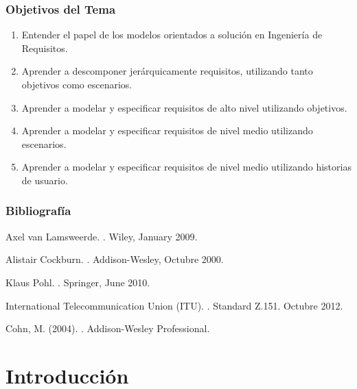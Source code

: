 \documentclass[handout,slidestop,xcolor=pst,dvips,blue]{beamer}
\begin{document}
\begin{frame}[c]
    \frametitle{Objetivos del Tema}
    \begin{enumerate}
         \item Entender el papel de los modelos orientados a solución en Ingeniería de Requisitos.
         \item Aprender a descomponer jerárquicamente requisitos, utilizando tanto objetivos como escenarios.
         \item Aprender a modelar y especificar requisitos de alto nivel utilizando objetivos.
         \item Aprender a modelar y especificar requisitos de nivel medio utilizando escenarios.
         \item Aprender a modelar y especificar requisitos de nivel medio utilizando historias de usuario.
    \end{enumerate}
\end{frame}

\begin{frame}[allowframebreaks,t]
    \frametitle{Bibliografía}
    \begin{thebibliography}{1}
Axel van Lamsweerde.
.
\newblock Wiley, January 2009.

Alistair Cockburn.
.
\newblock Addison-Wesley, Octubre 2000.

Klaus Pohl.
.
\newblock Springer, June 2010.

International Telecommunication Union (ITU).
.
\newblock Standard Z.151. Octubre 2012.

Cohn, M. (2004).
.
\newblock Addison-Wesley Professional.
\end{thebibliography}
\end{frame}

\section{Introducción}
\end{document}
